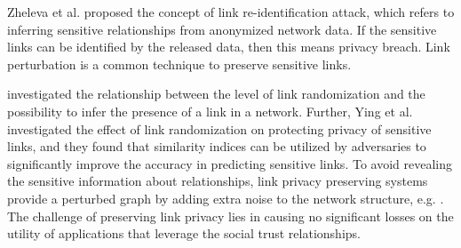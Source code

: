 Zheleva et al. \cite{zheleva2008preserving} proposed the concept of link re-identification attack, which refers to inferring sensitive relationships from anonymized network data. If the sensitive links can be identified by the released data, then this means privacy breach. Link perturbation is a common technique to preserve sensitive links. 

\cite{zheleva2008preserving,ying2008randomizing} investigated the relationship between the level of link randomization and the possibility to infer the presence of a link in a network. Further, Ying et al. \cite{ying2009link} investigated the effect of link randomization on protecting privacy of sensitive links, and they found that similarity indices can be utilized by adversaries to significantly improve the accuracy in predicting sensitive links.
To avoid revealing the sensitive information about relationships, link privacy preserving systems provide a perturbed graph by adding extra noise to the network structure, e.g. \cite{hay2008resisting,mittalNDSS13,ying2008randomizing,zheleva2008preserving}. The challenge of preserving link privacy lies in causing no significant losses on the utility of applications that leverage the social trust relationships.








